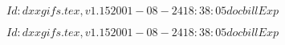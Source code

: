 \documentclass{article}
\begin{document}
$Id: dxxgifs.tex,v 1.15 2001-08-24 18:38:05 docbill Exp $


\pagebreak


$Id: dxxgifs.tex,v 1.15 2001-08-24 18:38:05 docbill Exp $


\pagebreak
\end{document}
